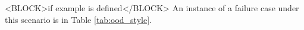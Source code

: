 <BLOCK>if example is defined</BLOCK>
An instance of a failure case under this scenario is in Table \ref{tab:ood_style}.
\renewcommand{\arraystretch}{1.5}

